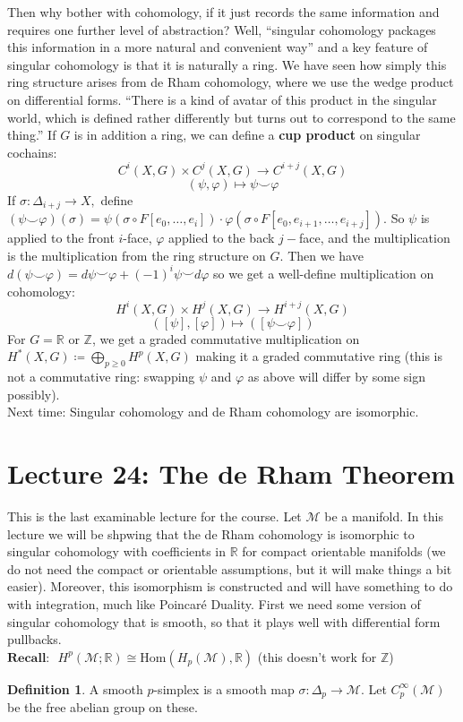 \documentclass[10pt]{article}
\theoremstyle{plain}
\theoremstyle{definition}
\newtheorem{defn}[thm]{Definition} %
\newcommand{\Recall}{\textbf{Recall: }}
\newcommand{\Real}{\mathbb{R}}
\newcommand{\man}{\mathcal{M}}
\newcommand{\Hom}[2]{\text{Hom}\left(#1,#2\right)}
\newcommand{\deriv}{d}
\newcommand{\Zint}{\mathbb{Z}}
\newcommand{\mysection}[1]{
    \setcounter{thm}{0}
    \section*{#1}
    \addcontentsline{toc}{section}{#1}
    \addtocounter{section}{1}
    \setcounter{subsection}{0}

}
\begin{document}
Then why bother with cohomology, if it just records the same information and requires one further level of abstraction? Well, ``singular cohomology packages this information in a more natural and convenient way'' and a key feature of singular cohomology is that it is naturally a ring. We have seen how simply this ring structure arises from de Rham cohomology, where we use the wedge product on differential forms. ``There is a kind of avatar of this product in the singular world, which is defined rather differently but turns out to correspond to the same thing.'' If $G$ is in addition a ring, we can define a \textbf{cup product} on singular cochains:
$$C^i(X,G) \times C^j(X,G) \to C^{i+j}(X,G)$$
$$(\psi, \varphi) \mapsto \psi \smile \varphi$$
If $\sigma : \Delta_{i+j} \to X,$ define $(\psi \smile \varphi)(\sigma) = \psi(\sigma \circ F[e_0,\ldots,e_i]) \cdot \varphi(\sigma \circ F[e_0, e_{i+1} , \ldots , e_{i+j}])$. So $\psi$ is applied to the front $i$-face, $\varphi$ applied to the back $j-$face, and the multiplication is the multiplication from the ring structure on $G$. Then we have $\deriv(\psi \smile \varphi) = \deriv \psi \smile \varphi + (-1)^i \psi \smile \deriv \varphi$ so we get a well-define multiplication on cohomology:
$$H^i(X,G) \times H^j(X,G) \to H^{i+j}(X,G) $$
$$([\psi] ,[\varphi]) \mapsto ([\psi \smile \varphi])$$
For $G = \Real$ or $\Zint$, we get a graded commutative multiplication on $H^*(X,G) \coloneqq \bigoplus\limits_{p\geq 0} H^p(X,G)$ making it a graded commutative ring (this is not a commutative ring: swapping $\psi$ and $\varphi$ as above will differ by some sign possibly).\\
Next time: Singular cohomology and de Rham cohomology are isomorphic.

\mysection{Lecture 24: The de Rham Theorem}
This is the last examinable lecture for the course. Let $\man$ be a manifold. In this lecture we will be shpwing that the de Rham cohomology is isomorphic to singular cohomology with coefficients in $\Real$ for compact orientable manifolds (we do not need the compact or orientable assumptions, but it will make things a bit easier). Moreover, this isomorphism is constructed and will have something to do with integration, much like Poincar\'e Duality. First we need some version of singular cohomology that is smooth, so that it plays well with differential form pullbacks.\\
$\Recall$ $H^p(\man;\Real) \cong \Hom{H_p(\man)}{\Real}$ (this doesn't work for $\Zint$)

\begin{defn}
    A smooth $p$-simplex is a smooth map $\sigma : \Delta_p \to \man$. Let $C^\infty_p(\man) $ be the free abelian group on these.
\end{defn}
\end{document}

